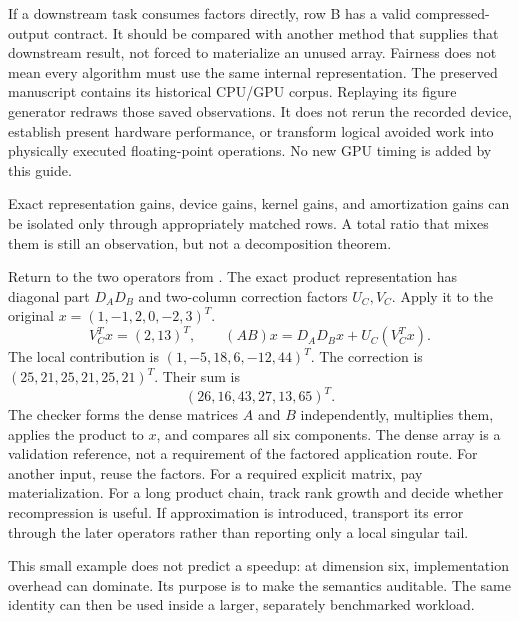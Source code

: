 If a downstream task consumes factors directly, row B has a valid compressed-output contract. It should be compared with another method that supplies that downstream result, not forced to materialize an unused array. Fairness does not mean every algorithm must use the same internal representation.
The preserved manuscript contains its historical CPU/GPU corpus. Replaying its figure generator redraws those saved observations. It does not rerun the recorded device, establish present hardware performance, or transform logical avoided work into physically executed floating-point operations. No new GPU timing is added by this guide.

Exact representation gains, device gains, kernel gains, and amortization gains can be isolated only through appropriately matched rows. A total ratio that mixes them is still an observation, but not a decomposition theorem.

Return to the two operators from . The exact product representation has diagonal part $D_AD_B$ and two-column correction factors $U_C,V_C$. Apply it to the original $x=(1,-1,2,0,-2,3)^T$.
\[
V_C^Tx=(2,13)^T,\qquad
(AB)x=D_AD_Bx+U_C(V_C^Tx).
\]
The local contribution is $(1,-5,18,6,-12,44)^T$. The correction is $(25,21,25,21,25,21)^T$. Their sum is
\[
(26,16,43,27,13,65)^T.
\]
The checker forms the dense matrices $A$ and $B$ independently, multiplies them, applies the product to $x$, and compares all six components. The dense array is a validation reference, not a requirement of the factored application route.
For another input, reuse the factors. For a required explicit matrix, pay materialization. For a long product chain, track rank growth and decide whether recompression is useful. If approximation is introduced, transport its error through the later operators rather than reporting only a local singular tail.

This small example does not predict a speedup: at dimension six, implementation overhead can dominate. Its purpose is to make the semantics auditable. The same identity can then be used inside a larger, separately benchmarked workload.

